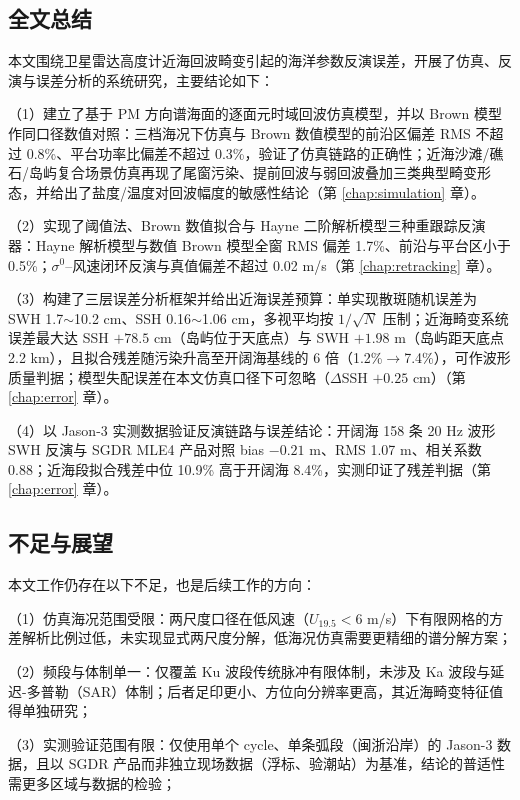 \documentclass[a4paper]{article}
\begin{document}
\subsection{全文总结}
本文围绕卫星雷达高度计近海回波畸变引起的海洋参数反演误差，开展了仿真、反演与误差分析的系统研究，主要结论如下：

（1）建立了基于 PM 方向谱海面的逐面元时域回波仿真模型，并以 Brown 模型作同口径数值对照：三档海况下仿真与 Brown 数值模型的前沿区偏差 RMS 不超过 0.8\%、平台功率比偏差不超过 0.3\%，验证了仿真链路的正确性；近海沙滩/礁石/岛屿复合场景仿真再现了尾窗污染、提前回波与弱回波叠加三类典型畸变形态，并给出了盐度/温度对回波幅度的敏感性结论（第 \ref{chap:simulation} 章）。

（2）实现了阈值法、Brown 数值拟合与 Hayne 二阶解析模型三种重跟踪反演器：Hayne 解析模型与数值 Brown 模型全窗 RMS 偏差 1.7\%、前沿与平台区小于 0.5\%；$\sigma^0$--风速闭环反演与真值偏差不超过 0.02 m/s（第 \ref{chap:retracking} 章）。

（3）构建了三层误差分析框架并给出近海误差预算：单实现散斑随机误差为 SWH 1.7$\sim$10.2 cm、SSH 0.16$\sim$1.06 cm，多视平均按 $1/\sqrt{N}$ 压制；近海畸变系统误差最大达 SSH $+78.5$ cm（岛屿位于天底点）与 SWH $+1.98$ m（岛屿距天底点 2.2 km），且拟合残差随污染升高至开阔海基线的 6 倍（1.2\%$\to$7.4\%），可作波形质量判据；模型失配误差在本文仿真口径下可忽略（$\Delta$SSH $+0.25$ cm）（第 \ref{chap:error} 章）。

（4）以 Jason-3 实测数据验证反演链路与误差结论：开阔海 158 条 20 Hz 波形 SWH 反演与 SGDR MLE4 产品对照 bias $-0.21$ m、RMS 1.07 m、相关系数 0.88；近海段拟合残差中位 10.9\% 高于开阔海 8.4\%，实测印证了残差判据（第 \ref{chap:error} 章）。

\subsection{不足与展望}
本文工作仍存在以下不足，也是后续工作的方向：

（1）仿真海况范围受限：两尺度口径在低风速（$U_{19.5} < 6$ m/s）下有限网格的方差解析比例过低，未实现显式两尺度分解，低海况仿真需要更精细的谱分解方案；

（2）频段与体制单一：仅覆盖 Ku 波段传统脉冲有限体制，未涉及 Ka 波段与延迟-多普勒（SAR）体制；后者足印更小、方位向分辨率更高，其近海畸变特征值得单独研究\cite{raney1998}；

（3）实测验证范围有限：仅使用单个 cycle、单条弧段（闽浙沿岸）的 Jason-3 数据，且以 SGDR 产品而非独立现场数据（浮标、验潮站）为基准，结论的普适性需更多区域与数据的检验\cite{vignudelli2011}；
\end{document}
